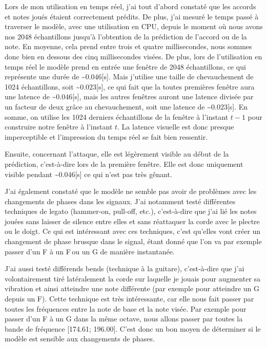 Lors de mon utilisation en temps réel, j'ai tout d'abord constaté que les accords et notes joués étaient correctement prédits. De plus, j'ai mesuré le temps passé à traverser le modèle, avec une utilisation en CPU, depuis le moment où nous avons nos 2048 échantillons jusqu'à l'obtention de la prédiction de l'accord ou de la note. En moyenne, cela prend entre trois et quatre millisecondes, nous sommes donc bien en dessous des cinq millisecondes visées. De plus, lors de l'utilisation en temps réel le modèle prend en entrée une fenêtre de 2048 échantillons, ce qui représente une durée de \textasciitilde$0.046$[s]. Mais j'utilise une taille de chevauchement de 1024 échantillons, soit \textasciitilde$0.023$[s], ce qui fait que la toutes premières fenêtre aura une latence de \textasciitilde$0.046$[s], mais les autres fenêtres auront une latence divisée par un facteur de deux grâce au chevauchement, soit une latence de \textasciitilde$0.023$[s]. En somme, on utilise les 1024 derniers échantillons de la fenêtre à l'instant $t-1$ pour construire notre fenêtre à l'instant $t$. La latence visuelle est donc presque imperceptible et l'impression du temps réel se fait bien ressentir.

Ensuite, concernant l'attaque, elle est légèrement visible au début de la prédiction, c'est-à-dire lors de la première fenêtre. Elle est donc uniquement visible pendant \textasciitilde$0.046$[s] ce qui n'est pas très gênant.

J'ai également constaté que le modèle ne semble pas avoir de problèmes avec les changements de phases dans les signaux. J'ai notamment testé différentes techniques de legato (hammer-on, pull-off, etc.), c'est-à-dire que j'ai lié les notes jouées sans laisser de silence entre elles et sans réattaquer la corde avec le plectre ou le doigt. Ce qui est intéressant avec ces techniques, c'est qu'elles vont créer un changement de phase brusque dans le signal, étant donné que l'on va par exemple passer d'un F à un F\sh\,ou un G de manière instantanée.

J'ai aussi testé différends bends (technique à la guitare), c'est-à-dire que j'ai volontairement tiré latéralement la corde sur laquelle je jouais pour augmenter sa vibration et ainsi atteindre une note différente (par exemple pour atteindre un G depuis un F). Cette technique est très intéressante, car elle nous fait passer par toutes les fréquences entre la note de base et la note visée. Par exemple pour passer d'un F à un G dans la même octave, nous allons passer par toutes la bande de fréquence [174.61; 196.00]. C'est donc un bon moyen de déterminer si le modèle est sensible aux changements de phases.

